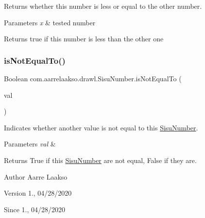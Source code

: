 Returns whether this number is less or equal to the other number. 


\begin{DoxyParams}{Parameters}
{\em x} & tested number \\
\hline
\end{DoxyParams}
\begin{DoxyReturn}{Returns}
true if this number is less than the other one 
\end{DoxyReturn}
\mbox{\label{classcom_1_1aarrelaakso_1_1drawl_1_1_sisu_number_ac6a98976517d96b810341475ad54789e}} 
\subsubsection{\texorpdfstring{is\+Not\+Equal\+To()}{isNotEqualTo()}}
{\footnotesize\ttfamily Boolean com.\+aarrelaakso.\+drawl.\+Sisu\+Number.\+is\+Not\+Equal\+To (\begin{DoxyParamCaption}\item[{\hyperlink{classcom_1_1aarrelaakso_1_1drawl_1_1_sisu_number}{Sisu\+Number}}]{val }\end{DoxyParamCaption})\hspace{0.3cm}{\ttfamily [protected]}}



Indicates whether another value is not equal to this \hyperlink{classcom_1_1aarrelaakso_1_1drawl_1_1_sisu_number}{Sisu\+Number}. 


\begin{DoxyParams}{Parameters}
{\em val} & \\
\hline
\end{DoxyParams}
\begin{DoxyReturn}{Returns}
True if this \hyperlink{classcom_1_1aarrelaakso_1_1drawl_1_1_sisu_number}{Sisu\+Number} are not equal, False if they are. 
\end{DoxyReturn}
\begin{DoxyAuthor}{Author}
Aarre Laakso 
\end{DoxyAuthor}
\begin{DoxyVersion}{Version}
1., 04/28/2020 
\end{DoxyVersion}
\begin{DoxySince}{Since}
1., 04/28/2020 
\end{DoxySince}
\mbox{\label{classcom_1_1aarrelaakso_1_1drawl_1_1_sisu_number_a75d9ca20aa1f3a990167780cdebc9473}} 
